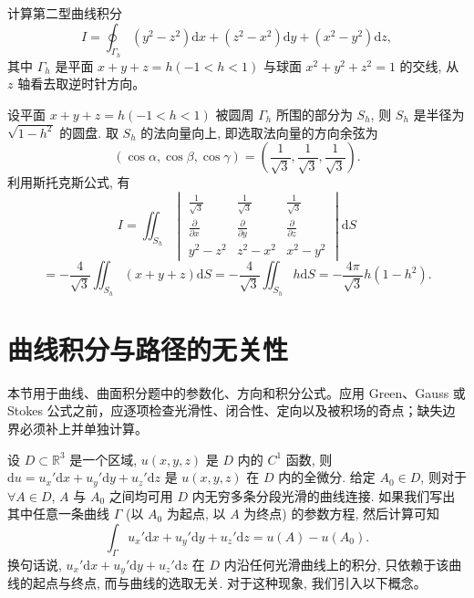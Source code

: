 \documentclass[UTF8,12pt,a4paper,fontset=fandol]{ctexart}
\begin{document}
\begin{example}\label{course-example-16-5-5}\quad 计算第二型曲线积分
\[
  I=\oint_{\Gamma_h}(y^2-z^2)\mathrm dx+(z^2-x^2)\mathrm dy+(x^2-y^2)\mathrm dz,
\]
其中 $\Gamma_h$ 是平面 $x+y+z=h(-1<h<1)$ 与球面 $x^2+y^2+z^2=1$ 的交线, 从 $z$ 轴看去取逆时针方向。

\end{example}
\begin{solve}\quad 设平面 $x+y+z=h(-1<h<1)$ 被圆周 $\Gamma_h$ 所围的部分为 $S_h$, 则 $S_h$ 是半径为 $\sqrt{1-h^2}$ 的圆盘. 取 $S_h$ 的法向量向上, 即选取法向量的方向余弦为
\[
  (\cos\alpha,\cos\beta,\cos\gamma)=\left(\frac1{\sqrt3},\frac1{\sqrt3},\frac1{\sqrt3}\right).
\]
利用斯托克斯公式, 有
\[
  I=\iint_{S_h}
  \begin{vmatrix}
    \frac1{\sqrt3}&\frac1{\sqrt3}&\frac1{\sqrt3}\\
    \frac{\partial}{\partial x}&\frac{\partial}{\partial y}&\frac{\partial}{\partial z}\\
    y^2-z^2&z^2-x^2&x^2-y^2
  \end{vmatrix}\mathrm dS
\]
\[
  =-\frac4{\sqrt3}\iint_{S_h}(x+y+z)\mathrm dS
  =-\frac4{\sqrt3}\iint_{S_h}h\mathrm dS
  =-\frac{4\pi}{\sqrt3}h(1-h^2).
\]

\end{solve}


\section{曲线积分与路径的无关性}\label{course-16-7}
本节用于曲线、曲面积分题中的参数化、方向和积分公式。应用 Green、Gauss 或 Stokes 公式之前，应逐项检查光滑性、闭合性、定向以及被积场的奇点；缺失边界必须补上并单独计算。

设 $D\subset\mathbb R^3$ 是一个区域, $u(x,y,z)$ 是 $D$ 内的 $C^1$ 函数, 则 $\mathrm du=u_x'\mathrm dx+u_y'\mathrm dy+u_z'\mathrm dz$ 是 $u(x,y,z)$ 在 $D$ 内的全微分. 给定 $A_0\in D$, 则对于 $\forall A\in D$, $A$ 与 $A_0$ 之间均可用 $D$ 内无穷多条分段光滑的曲线连接. 如果我们写出其中任意一条曲线 $\Gamma$ (以 $A_0$ 为起点, 以 $A$ 为终点) 的参数方程, 然后计算可知
\[
  \int_\Gamma u_x'\mathrm dx+u_y'\mathrm dy+u_z'\mathrm dz=u(A)-u(A_0).
\]
换句话说, $u_x'\mathrm dx+u_y'\mathrm dy+u_z'\mathrm dz$ 在 $D$ 内沿任何光滑曲线上的积分, 只依赖于该曲线的起点与终点, 而与曲线的选取无关. 对于这种现象, 我们引入以下概念。
\end{document}
